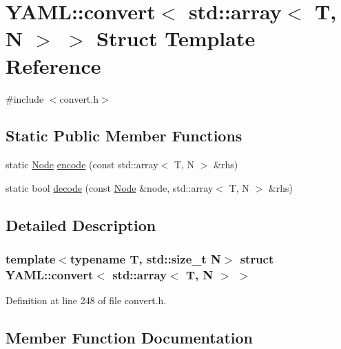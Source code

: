 \hypertarget{struct_y_a_m_l_1_1convert_3_01std_1_1array_3_01_t_00_01_n_01_4_01_4}{}\section{Y\+A\+ML\+::convert$<$ std\+::array$<$ T, N $>$ $>$ Struct Template Reference}
\label{struct_y_a_m_l_1_1convert_3_01std_1_1array_3_01_t_00_01_n_01_4_01_4}


{\ttfamily \#include $<$convert.\+h$>$}

\subsection*{Static Public Member Functions}
\begin{DoxyCompactItemize}
\item 
static \mbox{\hyperlink{class_y_a_m_l_1_1_node}{Node}} \mbox{\hyperlink{struct_y_a_m_l_1_1convert_3_01std_1_1array_3_01_t_00_01_n_01_4_01_4_ab773bcbd4257b6e7027b4a43d29e1075}{encode}} (const std\+::array$<$ T, N $>$ \&rhs)
\item 
static bool \mbox{\hyperlink{struct_y_a_m_l_1_1convert_3_01std_1_1array_3_01_t_00_01_n_01_4_01_4_a106d2680402a5b9f8a998679bf606fe5}{decode}} (const \mbox{\hyperlink{class_y_a_m_l_1_1_node}{Node}} \&node, std\+::array$<$ T, N $>$ \&rhs)
\end{DoxyCompactItemize}


\subsection{Detailed Description}
\subsubsection*{template$<$typename T, std\+::size\+\_\+t N$>$\newline
struct Y\+A\+M\+L\+::convert$<$ std\+::array$<$ T, N $>$ $>$}



Definition at line 248 of file convert.\+h.



\subsection{Member Function Documentation}
\mbox{\label{struct_y_a_m_l_1_1convert_3_01std_1_1array_3_01_t_00_01_n_01_4_01_4_a106d2680402a5b9f8a998679bf606fe5}} 
